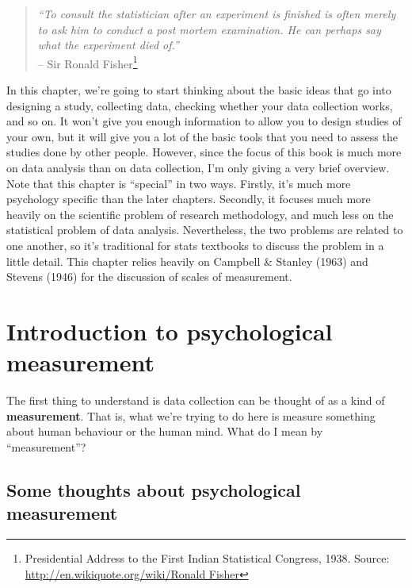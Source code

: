 \documentclass[
  letterpaper,
]{book}
\begin{document}
\begin{quote}
\emph{``To consult the statistician after an experiment is finished is
often merely to ask him to conduct a post mortem examination. He can
perhaps say what the experiment died of.''}\\
-- Sir Ronald Fisher\footnote{Presidential Address to the First Indian
  Statistical Congress, 1938. Source:
  \href{http://en.wikiquote.org/wik\%0Ai/Ronald\%20Fisher}{http://en.wikiquote.org/wiki/Ronald
  Fisher}}
\end{quote}

In this chapter, we're going to start thinking about the basic ideas
that go into designing a study, collecting data, checking whether your
data collection works, and so on. It won't give you enough information
to allow you to design studies of your own, but it will give you a lot
of the basic tools that you need to assess the studies done by other
people. However, since the focus of this book is much more on data
analysis than on data collection, I'm only giving a very brief overview.
Note that this chapter is ``special'' in two ways. Firstly, it's much
more psychology specific than the later chapters. Secondly, it focuses
much more heavily on the scientific problem of research methodology, and
much less on the statistical problem of data analysis. Nevertheless, the
two problems are related to one another, so it's traditional for stats
textbooks to discuss the problem in a little detail. This chapter relies
heavily on Campbell \& Stanley (1963) and Stevens (1946) for the
discussion of scales of measurement.

\hypertarget{sec-Introduction-to-psychological-measurement}{%
\section{Introduction to psychological
measurement}\label{sec-Introduction-to-psychological-measurement}}

The first thing to understand is data collection can be thought of as a
kind of \textbf{measurement}. That is, what we're trying to do here is
measure something about human behaviour or the human mind. What do I
mean by ``measurement''?

\hypertarget{some-thoughts-about-psychological-measurement}{%
\subsection{Some thoughts about psychological
measurement}\label{some-thoughts-about-psychological-measurement}}
\end{document}
